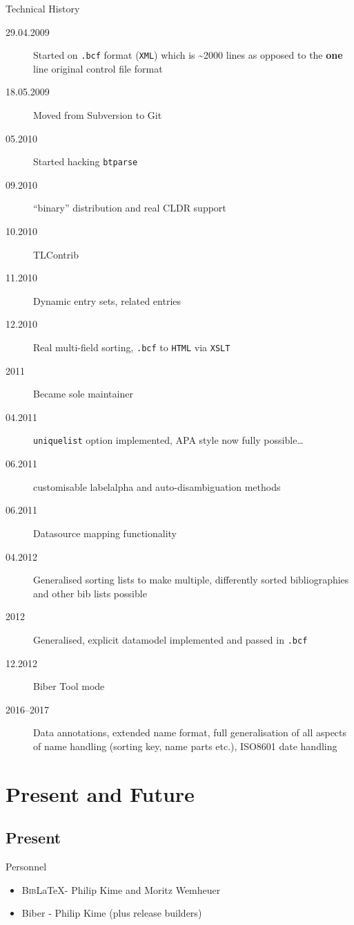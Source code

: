 \documentclass[xcolor=dvipsnames]{beamer}
\def\BibLaTeX{\textsc{Bib}\LaTeX}
\begin{document}
\begin{frame}[shrink=10]{Technical History}
  \begin{description}
  \item[29.04.2009] Started on \texttt{.bcf} format (\texttt{XML}) which is
    \textasciitilde 2000 lines as opposed to the \textbf{one} line original
    control file format
  \item[18.05.2009] Moved from Subversion to Git
  \item[05.2010] Started hacking \texttt{btparse}
  \item[09.2010] ``binary'' distribution and real CLDR support
  \item[10.2010] TLContrib
  \item[11.2010] Dynamic entry sets, related entries
  \item[12.2010] Real multi-field sorting, \texttt{.bcf} to \texttt{HTML} via \texttt{XSLT}
  \item[2011] Became sole maintainer
  \item[04.2011] \texttt{uniquelist} option  implemented, APA style now fully possible\ldots
  \item[06.2011] customisable labelalpha and auto-disambiguation methods
  \item[06.2011] Datasource mapping functionality
  \item[04.2012] Generalised sorting lists to make multiple, differently
    sorted bibliographies and other bib lists possible
  \item[2012] Generalised, explicit datamodel implemented and passed in \texttt{.bcf}
  \item[12.2012] Biber Tool mode
  \item[2016--2017] Data annotations, extended name format, full generalisation
    of all aspects of name handling (sorting key, name parts etc.), ISO8601 date handling
  \end{description}
\end{frame}

\section*{Present and Future}

\subsection*{Present}

\begin{frame}{Personnel}
  \begin{itemize}
  \item \BibLaTeX - Philip Kime and Moritz Wemheuer
  \item Biber - Philip Kime (plus release builders)
  \end{itemize}
\end{frame}
\end{document}
